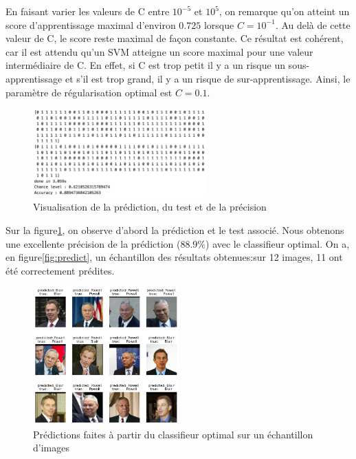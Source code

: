 \documentclass[a4paper,12pt]{article}
\begin{document}
En faisant varier les valeurs de C entre $10^{-5}$ et $10^{5}$, on remarque qu'on atteint un score d'apprentissage maximal d'environ $0.725$ lorsque $C=10^{-1}$.
Au delà de cette valeur de C, le score reste maximal de façon constante.
Ce résultat est cohérent, car il est attendu qu’un SVM atteigne un score maximal pour une valeur intermédiaire de 
C. En effet, si C est trop petit il y a un risque un sous-apprentissage et s'il est trop grand, il y a un risque de sur-apprentissage.
Ainsi, le paramètre de régularisation optimal est $C=0.1$.


\begin{figure}[H]    
    \centering    
    \includegraphics[width=0.6\textwidth]{Images/label_prediction.png}
    \caption{Visualisation de la prédiction, du test et de la précision}\label{fig:precision}
\end{figure}

Sur la figure\ref{fig:precision}, on observe d'abord la prédiction et le test associé.
Nous obtenons une excellente précision de la prédiction (88.9\%) avec le classifieur optimal. 
On a, en figure\ref{fig:predict}, un échantillon des résultats obtenues:sur 12 images, 11 ont été correctement prédites.

\begin{figure}[H]
    \centering
    \includegraphics[width=0.5\textwidth]{Images/prediction_visage.png}
    \caption{Prédictions faites à partir du classifieur optimal sur un échantillon d'images}\label{ref:predict}
\end{figure}
\end{document}
